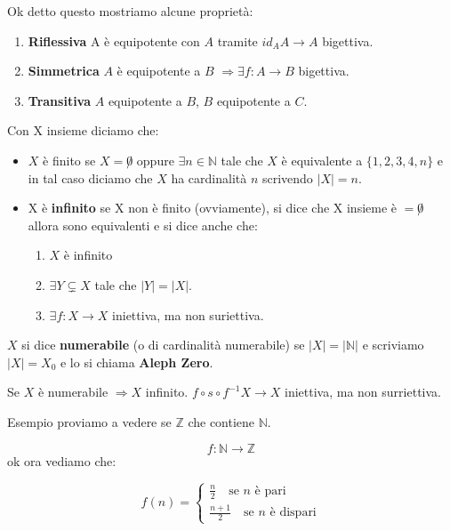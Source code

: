 \documentclass{article}
\begin{document}
Ok detto questo mostriamo alcune proprietà:
\begin{enumerate}
        \item \textbf{Riflessiva} A è equipotente con $A$ tramite $id_A A \rightarrow A$ bigettiva.
        \item \textbf{Simmetrica} $A$ è equipotente a $B$ $\Rightarrow \exists f:A \rightarrow B$ bigettiva. 
        \item \textbf{Transitiva} $A$ equipotente a $B$, $B$ equipotente a $C$.	
\end{enumerate}

Con X insieme diciamo che:
\begin{itemize}
        \item $X$ è finito se $X = \not 0$ oppure $\exists n \in \mathbb{N}$ tale che $X$ è equivalente a $\{1,2,3,4,n\}$ e in tal caso diciamo che $X$ ha cardinalità $n$ scrivendo $|X| = n$.
        \item X è \textbf{infinito} se X non è finito (ovviamente), si dice che X insieme è $= \not 0$ allora sono equivalenti e si dice anche che:
        \begin{enumerate}
                \item$X$ è infinito
                \item $\exists Y \subsetneq X$ tale che $|Y|=|X|$.
                \item $\exists f:X \to X$ iniettiva, ma non suriettiva.
        \end{enumerate}
\end{itemize}

$X$ si dice \textbf{numerabile} (o di cardinalità numerabile) se $|X| = |\mathbb{N}|$ e scriviamo $|X| = X_0$ e lo si chiama \textbf{Aleph Zero}. \par
Se $X$ è numerabile $\Rightarrow X$ infinito. \newline
$f \circ s \circ f^{-1} X \rightarrow X$ iniettiva, ma non surriettiva.

Esempio proviamo a vedere se $\mathbb{Z}$ che contiene $\mathbb{N}$. \par
\begin{equation}
        f : \mathbb{N} \rightarrow \mathbb{Z}
\end{equation}
ok ora vediamo che: \newline

\[
f(n) =
\begin{cases}
        \frac{n}{2} \quad \mbox{se $n$ è pari} \\
        \frac{n + 1}{2} \quad \mbox{se $n$ è dispari}
\end{cases}
\]
\end{document}
